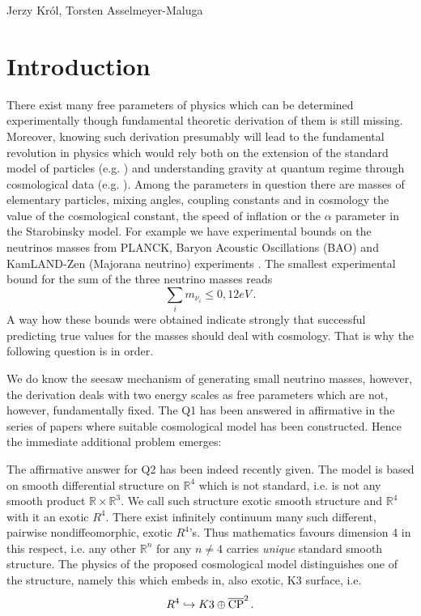 \begin{artengenv2auth}{Jerzy Kr\'ol, Torsten Asselmeyer-Maluga}
\section{Introduction}
\lettrine[loversize=0.13,lines=2,lraise=-0.05,nindent=0em,findent=0.2pt]%
{T}{}here exist many free parameters of physics which can be determined experimentally though fundamental theoretic derivation of them is still missing. Moreover, knowing such derivation presumably will lead to the fundamental revolution in physics which would rely both on the extension of the standard model of particles (e.g. \cite{Weinberg2018}) and understanding gravity at quantum regime through cosmological data (e.g. \cite{Woodard2014}). Among the parameters in question there are masses of elementary particles, mixing angles, coupling constants and in cosmology the value of the cosmological constant, the speed of inflation or the $\alpha$ parameter in the Starobinsky model. For example we have experimental bounds on the neutrinos masses from PLANCK, Baryon Acoustic Oscillations (BAO) and KamLAND-Zen (Majorana neutrino) experiments \parencite{Neutrino-mass-KmLAND-Zen2016,PlanckCosmoParam2015,Neutrino2015}. The smallest experimental bound for the sum of the three neutrino masses reads
\[ \sum_i m_{\nu_i}\leq 0,12eV\,.\]
A way how these bounds were obtained indicate strongly that successful predicting true values for the masses should deal with cosmology. That is why the following question is in order.


We do know the seesaw mechanism of generating small neutrino masses, however, the derivation deals with two energy scales as free parameters which are not, however, fundamentally fixed. The Q1 has been answered in affirmative in the series of papers \parencite{AK2018,AK2014,AK2019} where suitable cosmological model has been constructed. Hence the immediate additional problem emerges:


The affirmative answer for Q2 has been indeed recently given. The model is based on smooth differential structure on $\mathbb{R}^4$ which is not standard, i.e. is not any smooth product $\mathbb{R}\times\mathbb{R}^3$. We call such structure exotic smooth structure and $\mathbb{R}^4$ with it an exotic $R^4$. There exist infinitely continuum many such different, pairwise nondiffeomorphic, exotic $R^4$'s. Thus mathematics favours dimension 4 in this respect, i.e. any other $\mathbb{R}^n$ for any $n\neq 4$ carries {\em unique} standard smooth structure. The physics of the proposed cosmological model distinguishes one of the structure, namely this which embeds in, also exotic, K3 surface, i.e.
\[R^4\hookrightarrow K3\oplus \overline{{\rm CP}}^2\,.  \]


\end{artengenv2auth}
